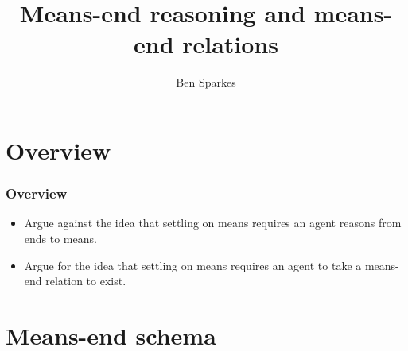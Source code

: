 \documentclass[noamssymb, compress, handout]{beamer} %
\title{Means-end reasoning and means-end relations}
\author{Ben Sparkes}
\begin{document}
\begin{frame}[noframenumbering]
  \titlepage
\end{frame}


\section*{Overview}
\label{sec:overview}

\begin{frame}
  \frametitle{Overview}

  \begin{itemize}
  \item Argue against the idea that settling on means requires an agent reasons from ends to means.
  \item Argue for the idea that settling on means requires an agent to take a means-end relation to exist.
  \end{itemize}
  
\end{frame}


\section{Means-end schema}
\label{sec:schema}






\end{document}
